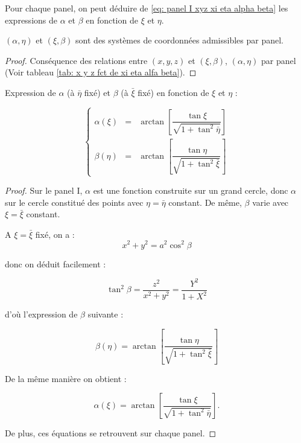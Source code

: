 Pour chaque panel, on peut déduire de \eqref{eq: panel I xyz xi eta alpha beta} les expressions de $\alpha$ et $\beta$ en fonction de $\xi$ et $\eta$. 

\begin{theoreme}
$(\alpha, \eta)$ et $(\xi, \beta)$ sont des systèmes de coordonnées admissibles par panel.
\end{theoreme} 

\begin{proof}
Conséquence des relations entre $(x,y,z)$ et $(\xi, \beta)$, $(\alpha, \eta)$ par panel (Voir tableau \ref{tab: x y z fct de xi eta alfa beta}).
\end{proof}


\begin{proposition}
Expression de $\alpha$ (à $\bar{\eta}$ fixé) et $\beta$ (à $\bar{\xi}$ fixé) en fonction de $\xi$ et $\eta$ :

\begin{equation}
\left\lbrace
\begin{array}{rcl}
\alpha(\xi) & = & \arctan \left[ \dfrac{\tan \xi}{\sqrt{1+\tan^2 \bar{\eta}}} \right] \\
\beta(\eta) & = & \arctan \left[ \dfrac{\tan \eta}{\sqrt{1+\tan^2 \bar{\xi}}} \right] 
\end{array}
\right.
\label{eq: alpha et beta fct de xi et eta}
\end{equation}
\end{proposition}

\begin{proof}
Sur le panel I, $\alpha$ est une fonction construite sur un grand cercle, donc $\alpha$ sur le cercle constitué des points avec $\eta=\bar{\eta}$ constant. De même, $\beta$ varie avec $\xi= \bar{\xi}$ constant. 

A $\xi= \bar{\xi}$ fixé, on a :
\begin{equation}
x^2 + y^2 = a^2 \cos^2 \beta
\end{equation}

donc on déduit facilement :

\begin{equation}
\tan^2 \beta = \dfrac{z^2}{x^2+y^2} = \dfrac{Y^2}{1+X^2}
\end{equation}

d'où l'expression de $\beta$ suivante :

\begin{equation}
\beta(\eta) = \arctan \left[ \dfrac{\tan \eta}{\sqrt{1+\tan^2 \bar{\xi}}} \right]
\end{equation}

De la même manière on obtient :

\begin{equation}
\alpha(\xi) = \arctan \left[ \dfrac{\tan \xi}{\sqrt{1+\tan^2 \bar{\eta}}} \right].
\end{equation}

De plus, ces équations se retrouvent sur chaque panel.
\end{proof}



